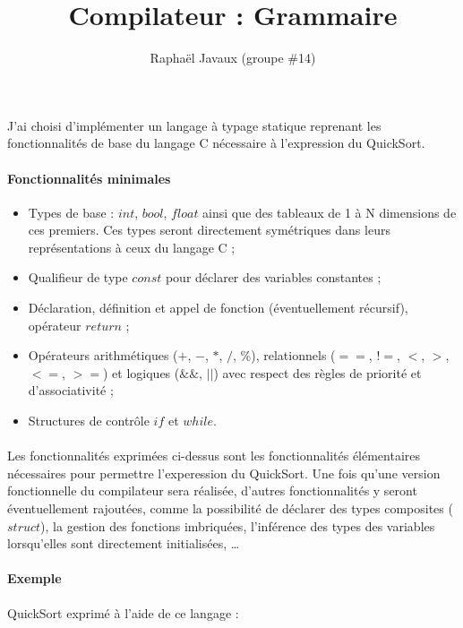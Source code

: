 \documentclass[a4paper]{article}
\title{Compilateur : Grammaire}
\author{Raphaël Javaux (groupe \#14)}
\date{}
\begin{document}
\maketitle

    \paragraph{}J'ai choisi d'implémenter un langage à typage statique reprenant
les fonctionnalités de base du langage C nécessaire à l'expression du QuickSort.

    \paragraph{Fonctionnalités minimales}

    \begin{itemize}
        \item Types de base : $int$, $bool$, $float$ ainsi que des tableaux de 1
à N dimensions de ces premiers. Ces types seront directement symétriques
dans leurs représentations à ceux du langage C ;
        \item Qualifieur de type $const$ pour déclarer des variables constantes
;
        \item Déclaration, définition et appel de fonction (éventuellement
récursif), opérateur $return$
;
        \item Opérateurs arithmétiques ($+$, $-$, $*$, $/$, $\%$), relationnels 
($==$, $!=$, $<$, $>$, $<=$, $>=$) et logiques ($\&\&$, $||$) avec respect des
règles de priorité et d'associativité ;
        \item Structures de contrôle $if$ et $while$.
    \end{itemize}

    \paragraph{}Les fonctionnalités exprimées ci-dessus sont les fonctionnalités 
élémentaires nécessaires pour permettre l'experession du QuickSort.
Une fois qu'une version fonctionnelle du compilateur sera réalisée, d'autres
fonctionnalités y seront éventuellement rajoutées, comme la possibilité de
déclarer des types composites ($struct$), la gestion des fonctions imbriquées,
l'inférence des types des variables lorsqu'elles sont directement initialisées,
\dots

    \paragraph{Exemple}QuickSort exprimé à l'aide de ce langage
:
\end{document}
